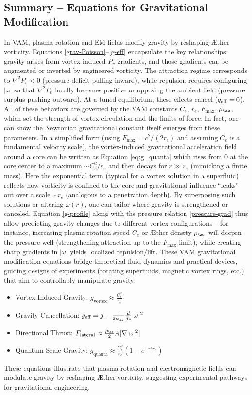 \subsection*{Summary – Equations for Gravitational Modification}
In VAM, plasma rotation and EM fields modify gravity by reshaping Æther vorticity. Equations \eqref{grav-Poisson}–\eqref{g-eff} encapsulate the key relationships: gravity arises from vortex-induced $P_v$ gradients, and those gradients can be augmented or inverted by engineered vorticity. The attraction regime corresponds to $\nabla^2 P_v < 0$ (pressure deficit pulling inward), while repulsion requires configuring $|\omega|$ so that $\nabla^2 P_v$ locally becomes positive or opposing the ambient field (pressure surplus pushing outward). At a tuned equilibrium, these effects cancel ($g_{\rm eff}=0$). All of these behaviors are governed by the VAM constants $C_e$, $r_e$, $F_{\max}$, $\rho_{\ae}$, which set the strength of vortex circulation and the limits of force. In fact, one can show the Newtonian gravitational constant itself emerges from these parameters. In a simplified form (using $F_{\max}=c^2/(2r_e)$ and assuming $C_e$ is a fundamental velocity scale), the vortex-induced gravitational acceleration field around a core can be written as Equation \eqref{eq:g_quanta} which rises from 0 at the core center to a maximum $\sim C_e^2/r_e$ and then decays for $r \gg r_e$ (mimicking a finite mass). Here the exponential term (typical for a vortex solution in a superfluid) reflects how vorticity is confined to the core and gravitational influence “leaks” out over a scale $\sim r_e$ (analogous to a penetration depth). By superposing such solutions or altering $\omega(r)$, one can tailor where gravity is strengthened or canceled. Equation \eqref{g-profile} along with the pressure relation \eqref{pressure-grad} thus allow predicting gravity changes due to different vortex configurations – for instance, increasing plasma rotation speed $C_e$ or Æther density $\rho_{\ae}$ will deepen the pressure well (strengthening attraction up to the $F_{\max}$ limit), while creating sharp gradients in $|\omega|$ yields localized repulsion/lift. These VAM gravitational modification equations bridge theoretical fluid dynamics and practical devices, guiding designs of experiments (rotating superfluids, magnetic vortex rings, etc.) that aim to controllably manipulate gravity.


\begin{itemize}
    \item Vortex-Induced Gravity: $g_{\text{vortex}} \approx \frac{C_e^2}{r_e}$
    \item Gravity Cancellation: $g_{\text{eff}} = g - \frac{1}{2 \rho_{\ae}} \frac{d}{dz} |\omega|^2$
    \item Directional Thrust: $F_{\text{lateral}} \approx \frac{\rho_{\ae}}{2} A |\nabla |\omega|^2|$
    \item Quantum Scale Gravity: $g_{\text{quanta}} \approx \frac{C_e^2}{r_e} (1 - e^{-r/r_e})$
\end{itemize}

These equations illustrate that plasma rotation and electromagnetic fields can modulate gravity by reshaping Æther vorticity, suggesting experimental pathways for gravitational engineering.









